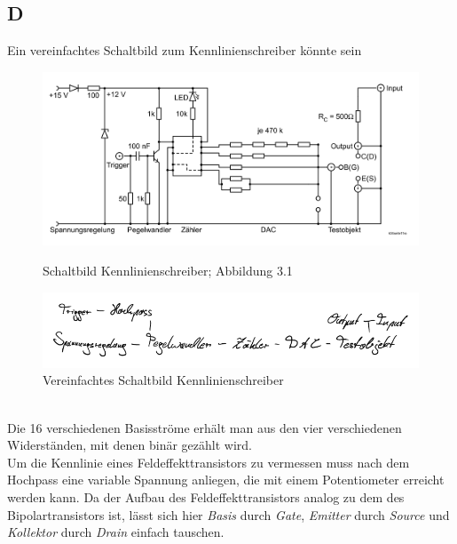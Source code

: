 \documentclass[a4paper,10pt]{article}
\numberwithin{equation}{section}
\begin{document}
\begin{multicols}{2}
\subsection{D}
Ein vereinfachtes Schaltbild zum Kennlinienschreiber könnte sein
\begin{figure}[h]
        \begin{minipage}{0.5\textwidth}
                \centering
                \includegraphics[width=\textwidth]{kennlinienschreiber.png}
                \caption{Schaltbild Kennlinienschreiber; Abbildung 3.1 \cite{Praktikumsanleitung}}
        \end{minipage}
        \begin{minipage}{0.5\textwidth}
                \centering
                \includegraphics[width=\textwidth]{D_crop.pdf}
                \caption{Vereinfachtes Schaltbild Kennlinienschreiber}
        \end{minipage}
\end{figure}\\
Die 16 verschiedenen Basisströme erhält man aus den vier verschiedenen Widerständen, mit denen binär gezählt wird.
\\\indent Um die Kennlinie eines Feldeffekttransistors zu vermessen muss nach dem Hochpass eine variable Spannung anliegen, die mit einem Potentiometer erreicht werden kann.
Da der Aufbau des Feldeffekttransistors analog zu dem des Bipolartransistors ist, lässt sich hier \textit{Basis} durch \textit{Gate}, \textit{Emitter} durch \textit{Source} und \textit{Kollektor} durch \textit{Drain} einfach tauschen.


\end{multicols}
\end{document}
